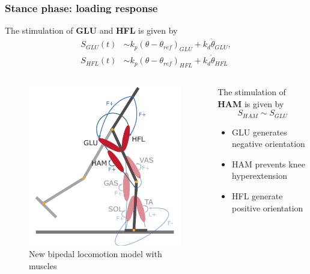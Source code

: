 \documentclass[10pt]{beamer}
\begin{document}
	
	\begin{frame}
		\frametitle{Stance phase: loading response}
		
		\begin{block}{}
			The stimulation of \textbf{GLU} and \textbf{HFL}  is given by
			\begin{align*}
				S_{GLU}(t) &\sim k_p (\theta-\theta_{ref})_{GLU} + k_d \dot{\theta}_{GLU}, \\
				S_{HFL}(t) &\sim k_p (\theta-\theta_{ref})_{HFL} + k_d \dot{\theta}_{HFL}
			\end{align*}
		\end{block}
		
		\begin{columns}
			\begin{column}{.5\textwidth}
				\begin{figure}
					\centering
					\includegraphics[height=.45\textheight]{images/new_model/stance/muscle_vas_sol_gas_ta_ham_glu_hfl_floor.pdf}
					\caption{New bipedal locomotion model with muscles}	
				\end{figure}
			\end{column}
			\begin{column}{.5\textwidth}
				\begin{block}{}
					The stimulation of \textbf{HAM} is given by	
					\begin{equation*}
						S_{HAM} \sim S_{GLU}
					\end{equation*}
				\end{block}		
				
				\begin{itemize}
					\item GLU generates negative orientation
					\item HAM prevents knee hyperextension
					\item HFL generate positive orientation				
				\end{itemize}
			\end{column}
		\end{columns}
	\end{frame}
	
\end{document}
